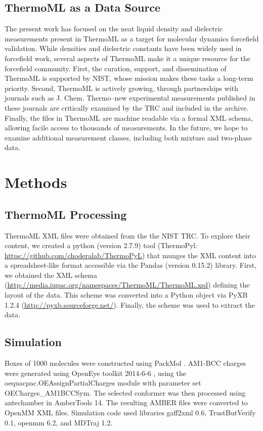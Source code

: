 \documentclass[journal=jacsat,manuscript=article]{achemso}
\begin{document}
\subsection{ThermoML as a Data Source}

The present work has focused on the neat liquid density and dielectric measurements present in ThermoML \cite{frenkel2006xml, frenkel2003thermoml, chirico2003thermoml} as a target for molecular dynamics forcefield validation.  While densities and dielectric constants have been widely used in forcefield work, several aspects of ThermoML make it a unique resource for the forcefield community.  First, the curation, support, and dissemination of ThermoML is supported by NIST, whose mission makes these tasks a long-term priority.  Second, ThermoML is actively growing, through partnerships with journals such as J. Chem. Thermo--new experimental measurements published in these journals are critically examined by the TRC and included in the archive.  Finally, the files in ThermoML are machine readable via a formal XML schema, allowing facile access to thousands of measurements.  In the future, we hope to examine additional measurement classes, including both mixture and two-phase data.


\section{Methods}

\subsection{ThermoML Processing}

ThermoML XML files were obtained from the the NIST TRC.  To explore their content, we created a python (version 2.7.9) tool (ThermoPyl: \url{https://github.com/choderalab/ThermoPyL}) that munges the XML content into a spreadsheet-like format accessible via the  Pandas (version 0.15.2) library.  First, we obtained the XML schema (\url{http://media.iupac.org/namespaces/ThermoML/ThermoML.xsd}) defining the layout of the data.  This scheme was converted into a Python object via PyXB 1.2.4 (\url{http://pyxb.sourceforge.net/}).  Finally, the scheme was used to extract the data.  

\subsection{Simulation}
Boxes of 1000 molecules were constructed using PackMol \cite{martinez2009packmol}.  AM1-BCC charges were generated using OpenEye toolkit 2014-6-6 \cite{openeye}, using the oequacpac.OEAssignPartialCharges module with parameter set OECharges\_AM1BCCSym.  The selected conformer was then processed using antechamber in AmberTools 14.  The resulting AMBER files were converted to OpenMM \cite{eastman2012openmm} XML files.  Simulation code used libraries gaff2xml 0.6, TrustButVerify 0.1, openmm 6.2, and MDTraj \cite{mcgibbon2014mdtraj} 1.2.  
\end{document}
